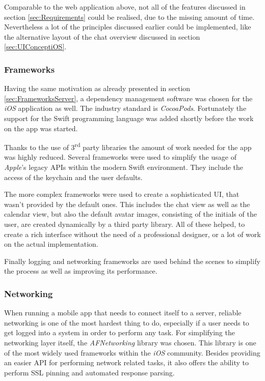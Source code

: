 Comparable to the web application above, not all of the features discussed in section \vref{sec:Requirements} could be realised, due to the missing amount of time. Nevertheless a lot of the principles discussed earlier could be implemented, like the alternative layout of the chat overview discussed in section \vref{sec:UIConceptiOS}.

\subsubsection{Frameworks}
Having the same motivation as already presented in section \vref{sec:FrameworksServer}, a dependency management software was chosen for the \emph{iOS} application as well. The industry standard is \emph{CocoaPods}. Fortunately the support for the \gls{Swift} programming language was added shortly before the work on the app was started. 

Thanks to the use of 3\textsuperscript{rd} party libraries the amount of work needed for the app was highly reduced. Several frameworks were used to simplify the usage of \emph{Apple}'s legacy \gls{API}s within the modern \gls{Swift} environment. They include the access of the keychain and the user defaults.

The more complex frameworks were used to create a sophisticated \gls{UI}, that wasn't provided by the default ones. This includes the chat view as well as the calendar view, but also the default avatar images, consisting of the initials of the user, are created dynamically by a third party library. All of these helped, to create a rich interface without the need of a professional designer, or a lot of work on the actual implementation. 

Finally logging and networking frameworks are used behind the scenes to simplify the process as well as improving its performance.

\subsubsection{Networking}

When running a mobile app that needs to connect itself to a server, reliable networking is one of the most hardest thing to do, especially if a user needs to get logged into a system in order to perform any task. For simplifying the networking layer itself, the \emph{AFNetworking} library was chosen. This library is one of the most widely used frameworks within the \emph{iOS} community. Besides providing an easier \gls{API} for performing network related tasks, it also offers the ability to perform SSL pinning and automated response parsing.

